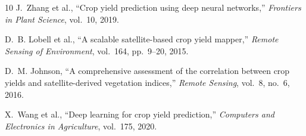 \documentclass[conference]{IEEEtran}
\begin{document}

\begin{thebibliography}{10}
J.~Zhang et al., ``Crop yield prediction using deep neural networks,'' \textit{Frontiers in Plant Science}, vol.~10, 2019.

D.~B. Lobell et al., ``A scalable satellite-based crop yield mapper,'' \textit{Remote Sensing of Environment}, vol.~164, pp.~9--20, 2015.

D.~M. Johnson, ``A comprehensive assessment of the correlation between crop yields and satellite-derived vegetation indices,'' \textit{Remote Sensing}, vol.~8, no.~6, 2016.

X.~Wang et al., ``Deep learning for crop yield prediction,'' \textit{Computers and Electronics in Agriculture}, vol.~175, 2020.
\end{thebibliography}
\end{document}
